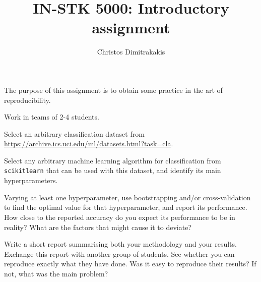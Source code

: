 \documentclass[a4paper]{article}
\title{IN-STK 5000: Introductory assignment}
\author{Christos Dimitrakakis}
\begin{document}
\maketitle
The purpose of this assignment is to obtain some practice in the art of reproducibility.

\begin{exercise}
  Work in teams of 2-4 students.

  Select an arbitrary classification dataset from \url{https://archive.ics.uci.edu/ml/datasets.html?task=cla}. 

  Select any arbitrary machine learning algorithm for classification
  from \texttt{scikitlearn} that can be used with this dataset, and identify its main hyperparameters.
    
  Varying at least one hyperparameter, use bootstrapping and/or
  cross-validation to find the optimal value for that hyperparameter,
  and report its performance. How close to the reported accuracy do
  you expect its performance to be in reality?  What are the factors
  that might cause it to deviate?
  
  Write a short report summarising both your methodology and your
  results. Exchange this report with another group of students. See
  whether you can reproduce exactly what they have done. Was it easy
  to reproduce their results? If not, what was the main problem?
\end{exercise}
\end{document}
